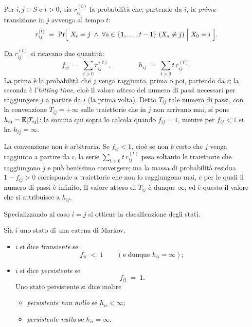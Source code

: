 \begin{definizione}\label{def:first-transition}
  Per $i, j \in S$ e $t > 0$, sia $r^{(t)}_{ij}$ la probabilità che, partendo da $i$, la
  \emph{prima} transizione in $j$ avvenga al tempo $t$:
  \[
    r^{(t)}_{ij} \;=\;
    \Pr\Bigl[\; X_t = j \;\wedge\; \forall s \in \{1, \dots, t-1\}\;(X_s \ne j)
      \;\Big|\; X_0 = i \;\Bigr].
  \]
\end{definizione}

Da $r^{(t)}_{ij}$ si ricavano due quantità:
\[
  f_{ij} \;=\; \sum_{t > 0} r^{(t)}_{ij},
  \qquad\qquad
  h_{ij} \;=\; \sum_{t > 0} t\, r^{(t)}_{ij}.
\]
La prima è la probabilità che $j$ venga raggiunto, prima o poi, partendo da $i$; la
seconda è l'\emph{hitting time}, cioè il valore atteso del numero di passi necessari per
raggiungere $j$ a partire da $i$ (la prima volta). Detto $T_{ij}$ tale numero di passi,
con la convenzione $T_{ij} = +\infty$ sulle traiettorie che in $j$ non arrivano mai, si
pone $h_{ij} = \E[T_{ij}]$: la somma qui sopra lo calcola quando $f_{ij} = 1$, mentre
per $f_{ij} < 1$ si ha $h_{ij} = \infty$.

\begin{osservazione}
  La convenzione non è arbitraria. Se $f_{ij} < 1$, cioè se non è certo che $j$ venga
  raggiunto a partire da $i$, la serie $\sum_{t>0} t\, r^{(t)}_{ij}$ pesa soltanto le
  traiettorie che raggiungono $j$ e può benissimo convergere; ma la massa di probabilità
  residua $1 - f_{ij} > 0$ corrisponde a traiettorie che non lo raggiungono mai, e per le
  quali il numero di passi è infinito. Il valore atteso di $T_{ij}$ è dunque $\infty$, ed
  è questo il valore che si attribuisce a $h_{ij}$.
\end{osservazione}

Specializzando al caso $i = j$ si ottiene la classificazione degli stati.

\begin{definizione}\label{def:mc-transiente-persistente}
Sia $i$ uno stato di una catena di Markov.
\begin{itemize}
  \item $i$ si dice \emph{transiente} se
    \[
      f_{ii} \;<\; 1 \qquad (\text{e dunque } h_{ii} = \infty);
    \]
  \item $i$ si dice \emph{persistente} se
    \[
      f_{ii} \;=\; 1 .
    \]
    Uno stato persistente si dice inoltre
    \begin{itemize}
      \item \emph{persistente non nullo} se $h_{ii} < \infty$;
      \item \emph{persistente nullo} se $h_{ii} = \infty$.
    \end{itemize}
\end{itemize}
\end{definizione}

